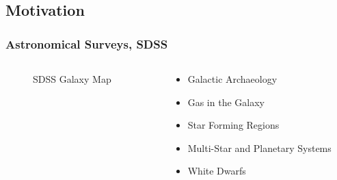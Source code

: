 \documentclass{beamer}
\begin{document}
\subsection{Motivation}
\begin{frame}
 	\frametitle{Astronomical Surveys, SDSS}
    \begin{columns}[onlytextwidth]
    \begin{column}{.45\textwidth}
        \begin{figure}
            \caption*{SDSS Galaxy Map}
        \end{figure}
    \end{column}
    \hfill
    \begin{column}{.45\textwidth}
    \begin{itemize}
        \item Galactic Archaeology
        \item Gas in the Galaxy
        \item Star Forming Regions
        \item Multi-Star and Planetary Systems
        \item White Dwarfs
    \end{itemize}
    \end{column}
    \end{columns}
    \end{frame}
\end{document}
